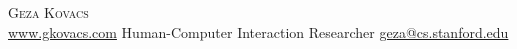 \documentclass[10pt,A4]{article}
\newcommand{\metasection}[2]
{
\footnotesize{#2} \hspace*{\fill} \footnotesize{#1}\\[1pt]
}
\begin{document}
\pagestyle{fancy}	








\vspace{-8pt}
\begin{center}
	\HUGE \textsc{Geza Kovacs}\\[2pt]
	\small \hypersetup{urlcolor=black}\href{https://www.gkovacs.com}{www.gkovacs.com}\hypersetup{urlcolor=linkcol} \hfill \hspace{5mm} Human-Computer Interaction Researcher \hfill \hypersetup{urlcolor=black}\href{mailto:geza@cs.stanford.edu}{geza@cs.stanford.edu}\hypersetup{urlcolor=linkcol}
\end{center}






\normalsize
\end{document}
